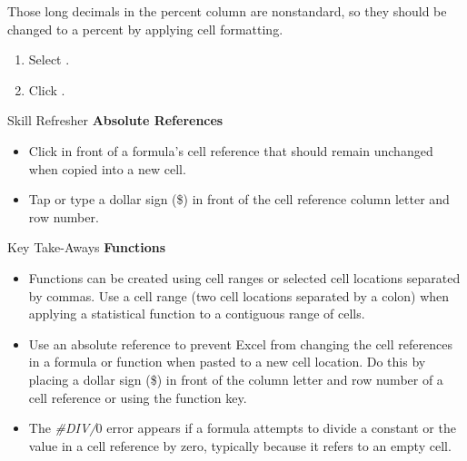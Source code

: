 Those long decimals in the percent column are nonstandard, so they should be changed to a percent by applying cell formatting.

\begin{enumbox}
	\begin{enumerate}
		\item Select .
		\item Click .
	\end{enumerate}
\end{enumbox}

\begin{center}
	\begin{sklbox}{Skill Refresher}
		\textbf{Absolute References}
		\\
		\begin{itemize}
			\setlength{\itemsep}{0pt}
			\setlength{\parskip}{0pt}
			\setlength{\parsep}{0pt}

			\item Click in front of a formula's cell reference that should remain unchanged when copied into a new cell.
			\item Tap  or type a dollar sign (\$) in front of the cell reference column letter and row number.
						
		\end{itemize}
	\end{sklbox}
\end{center}

\begin{center}
	\begin{tkwbox}{Key Take-Aways}
		\textbf{Functions}
		\\
		\begin{itemize}
			\setlength{\itemsep}{0pt}
			\setlength{\parskip}{0pt}
			\setlength{\parsep}{0pt}

			\item Functions can be created using cell ranges or selected cell locations separated by commas. Use a cell range (two cell locations separated by a colon) when applying a statistical function to a contiguous range of cells.
			\item Use an absolute reference to prevent Excel from changing the cell references in a formula or function when pasted to a new cell location. Do this by placing a dollar sign (\$) in front of the column letter and row number of a cell reference or using the  function key.
			\item The \textit{\#DIV/$ 0 $} error appears if a formula attempts to divide a constant or the value in a cell reference by zero, typically because it refers to an empty cell.
			
		\end{itemize}
	\end{tkwbox}
\end{center}


